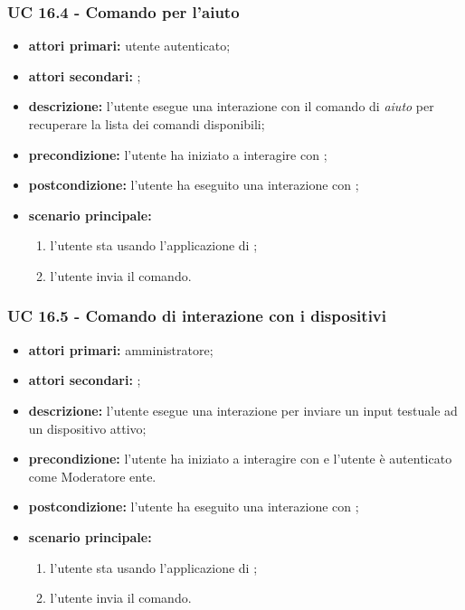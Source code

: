 	\subsubsection{UC 16.4 - Comando per l'aiuto}


	\begin{itemize}
		\item \textbf{attori primari:} utente autenticato;
		\item \textbf{attori secondari:} ;
		\item \textbf{descrizione:} l'utente esegue una interazione con il comando di \textit{aiuto} per recuperare la lista dei comandi disponibili;
		\item \textbf{precondizione:} l'utente ha iniziato a interagire con ;
		\item \textbf{postcondizione:} l'utente ha eseguito una interazione con ;
		\item \textbf{scenario principale:}
		\begin{enumerate}
			\item l'utente sta usando l'applicazione di ;
			\item l'utente invia il comando.
		\end{enumerate}
	\end{itemize}


	\subsubsection{UC 16.5 - Comando di interazione con i dispositivi}

	\begin{itemize}
		\item \textbf{attori primari:} amministratore;
		\item \textbf{attori secondari:} ;
		\item \textbf{descrizione:} l'utente esegue una interazione per inviare un input testuale ad un dispositivo attivo;
		\item \textbf{precondizione:} l'utente ha iniziato a interagire con  e l'utente è autenticato come Moderatore ente.
		\item \textbf{postcondizione:} l'utente ha eseguito una interazione con ;
		\item \textbf{scenario principale:}
		\begin{enumerate}
			\item l'utente sta usando l'applicazione di ;
			\item l'utente invia il comando.
		\end{enumerate}
	\end{itemize}

